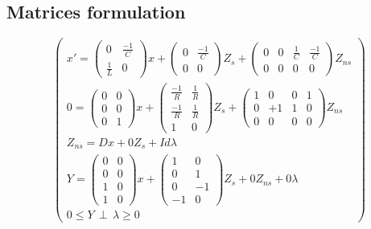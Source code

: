 \documentclass[10pt]{article}
\begin{document}
\subsection{Matrices formulation}
\[
\left(\begin{array}{c}
  
x'=\left(\begin{array}{cc}
0 &\frac{-1}{C}\\
\frac{1}{L}&0\end{array} \right)x
+\left(\begin{array}{cc}
0&\frac{-1}{C}\\
0&0\end{array} \right)Z_{s}
+\left(\begin{array}{cccc}
0&0&\frac{1}{C}&\frac{-1}{C}\\
0&0&0&0\end{array} \right)Z_{ns}
\\
0=\left(\begin{array}{cc}
0 &0\\
0 &0\\
0 &1\end{array} \right)x
+\left(\begin{array}{cc}
\frac{-1}{R}&\frac{1}{R}\\
\frac{-1}{R}&\frac{1}{R}\\
1&0\end{array} \right)Z_{s}
+\left(\begin{array}{cccc}
1&0&0&1\\
0&+1&1&0\\
0&0&0&0\end{array} \right)Z_{ns}
\\
Z_{ns}=Dx+0Z_{s}+Id\lambda\\
Y=\left(\begin{array}{cc}
0&0\\
0&0\\
1&0\\
1&0\end{array}\right) x+
\left(\begin{array}{cc}
1&0\\
0&1\\
0&-1\\
-1&0\end{array}
\right) Z_{s} + 0Z_{ns} +0\lambda\\

0 \leq Y \, \perp \, \lambda \geq 0

\end{array}
\right)
\]
\end{document}
